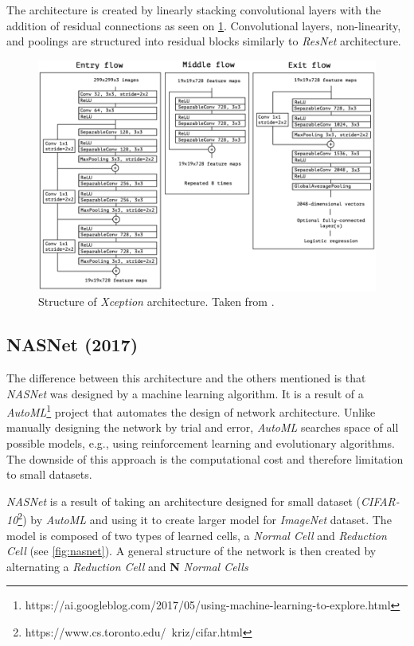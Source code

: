The architecture is created by linearly stacking convolutional layers with the addition of residual connections as seen on \cref{fig:xception}. Convolutional layers, non-linearity, and poolings are structured into residual blocks similarly to \textit{ResNet} architecture.

\begin{figure}
    \includegraphics[width=\textwidth]{img/xception}
    \caption{Structure of \textit{Xception} architecture. Taken from \cite[fig. 5]{bib:xception}.}
    \label{fig:xception}
\end{figure}


\subsection{NASNet (2017)}
\label{sec:nasnet}
The difference between this architecture and the others mentioned is that \textit{NASNet} \cite{bib:nasnet} was designed by a machine learning algorithm. It is a result of a \textit{AutoML}\footnote{https://ai.googleblog.com/2017/05/using-machine-learning-to-explore.html} project that automates the design of network architecture. Unlike manually designing the network by trial and error, \textit{AutoML} searches space of all possible models, e.g., using reinforcement learning and evolutionary algorithms. The downside of this approach is the computational cost and therefore limitation to small datasets.

\textit{NASNet} is a result of taking an architecture designed for small dataset (\textit{CIFAR-10}\footnote{https://www.cs.toronto.edu/~kriz/cifar.html}) by \textit{AutoML} and using it to create larger model for \textit{ImageNet} dataset. The model is composed of two types of learned cells, a \textit{Normal Cell} and \textit{Reduction Cell} (see \cref{fig:nasnet}). A general structure of the network is then created by alternating a \textit{Reduction Cell} and \textbf{N} \textit{Normal Cells}

